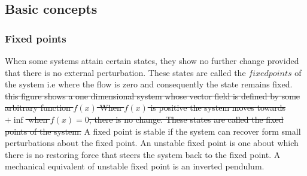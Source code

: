 \subsection{Basic concepts}

\subsubsection{Fixed points}
When some systems attain certain states, they show no further change provided that there is no external perturbation. These states are called the $fixed points$ of the system i.e where the flow is zero and consequently the state remains fixed.  \st{this figure shows a one dimensional system whose vector field is defined by some arbitrary function $f(x)$ When $f(x)$ is positive the system moves towards $+ \inf$ when $f(x) = 0$, there is no change. These states are called the fixed points of the system.} A fixed point is stable if the system can recover form small perturbations about the fixed point.  An unstable fixed point is one about which there is no restoring force that steers the system back to the fixed point.  A mechanical equivalent of unstable fixed point is an inverted pendulum.



